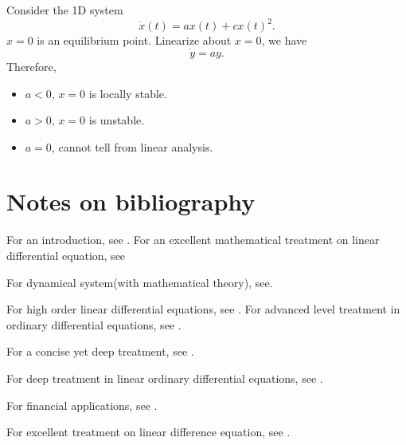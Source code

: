 \begin{refsection}
\begin{example}\cite[327]{luenberger1979introduction}
Consider the 1D system
$$\dot{x}(t) = ax(t) + cx(t)^2.$$
$x = 0$ is an equilibrium point. Linearize about $x = 0$, we have
$$\dot{y} = ay.$$
Therefore, 
\begin{itemize}
	\item $a<0$, $x=0$ is locally stable.
	\item $a>0$, $x = 0$ is unstable.
	\item $a=0$, cannot tell from linear analysis.
\end{itemize}
\end{example}




\section{Notes on bibliography}

For an introduction, see \cite{luenberger1979introduction}.
For an excellent mathematical treatment on linear differential equation, see\cite{hirsch1974differential}


For dynamical system(with mathematical theory), see\cite{hirsch2012differential}\cite{perko2013differential}.

For high order linear differential equations, see \cite{Earl1989introduction}.
For advanced level treatment in ordinary differential equations, see \cite{coddington1955theory}.

For a concise yet deep treatment, see \cite{sanchez1968ordinary}.

For deep treatment in linear ordinary differential equations, see \cite{coddington1955theory}.

For financial applications, see \cite{zhu2004derivative}.


For excellent treatment on linear difference equation, see \cite{jerri2013linear}.
\printbibliography


\end{refsection}
